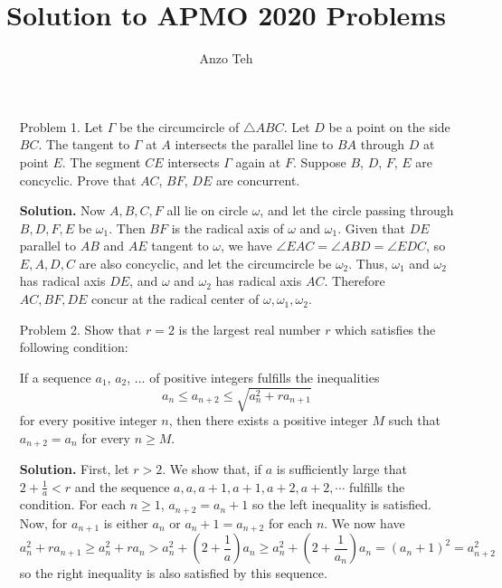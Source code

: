 \documentclass[11pt,a4paper]{article}
\begin{document}
\newcommand{\la}{\leftarrow}
\newcommand{\lra}{\leftrightarrow}
\newcommand{\bbN}{\mathbb{N}}
\newcommand{\bbZ}{\mathbb{Z}}
\newcommand{\dsum}{\displaystyle\sum}
\newcommand{\dprod}{\displaystyle\prod}


\title{Solution to APMO 2020 Problems}
\author{Anzo Teh}
\date{}
\maketitle

\begin{enumerate}
	\item [Problem 1.] Let $\Gamma$ be the circumcircle of $\triangle ABC$. Let $D$ be a point on the side $BC$. The tangent to $\Gamma$ at $A$ intersects the parallel line to $BA$ through $D$ at point $E$. The segment $CE$ intersects $\Gamma$ again at $F$. Suppose $B$, $D$, $F$, $E$ are concyclic. Prove that $AC$, $BF$, $DE$ are concurrent.
	
	\textbf{Solution.} Now $A, B, C, F$ all lie on circle $\omega$, and let the circle passing through $B, D, F, E$ be $\omega_1$. Then $BF$ is the radical axis of $\omega$ and $\omega_1$. Given that $DE$ parallel to $AB$ and $AE$ tangent to $\omega$, we have $\angle EAC=\angle ABD=\angle EDC$, so $E, A, D, C$ are also concyclic, and let the circumcircle be $\omega_2$. Thus, $\omega_1$ and $\omega_2$ has radical axis $DE$, and $\omega$ and $\omega_2$ has radical axis $AC$. Therefore $AC, BF, DE$ concur at the radical center of $\omega, \omega_1, \omega_2$. 
	
	\item [Problem 2.] Show that $r = 2$ is the largest real number $r$ which satisfies the following condition:
	
	If a sequence $a_1$, $a_2$, $\ldots$ of positive integers fulfills the inequalities
	\[a_n \leq a_{n+2} \leq\sqrt{a_n^2+ra_{n+1}}\]for every positive integer $n$, then there exists a positive integer $M$ such that $a_{n+2} = a_n$ for every $n \geq M$.
	
	\textbf{Solution.} First, let $r>2$. We show that, if $a$ is sufficiently large that $2+\frac 1{a}<r$ and the sequence $a, a, a+1, a+1, a+2, a+2, \cdots$ fulfills the condition. For each $n\ge 1$, $a_{n+2}=a_n+1$ so the left inequality is satisfied. 
	Now, for $a_{n+1}$ is either $a_n$ or $a_n+1=a_{n+2}$ for each $n$. We now have 
	\[
	a_n^2+ra_{n+1}\ge a_n^2+ra_n> a_n^2+(2+\frac 1{a})a_n \ge a_n^2+(2+\frac 1{a_n})a_n = (a_n+1)^2=a_{n+2}^2
	\]
	so the right inequality is also satisfied by this sequence. 
	

\end{enumerate}
\end{document}
